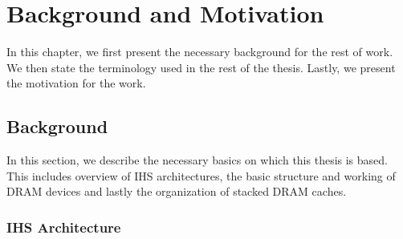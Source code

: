 \chapter{Background and Motivation} \label{chap:background}
In this chapter, we first present the necessary background for the rest of work. We then state the terminology used in the rest of the thesis. Lastly, we present the motivation for the work.

\section{Background}
In this section, we describe the necessary basics on which this thesis is based. This includes overview of IHS architectures, the basic structure and working of DRAM devices and lastly the organization of stacked DRAM caches.
\subsection{IHS Architecture}

